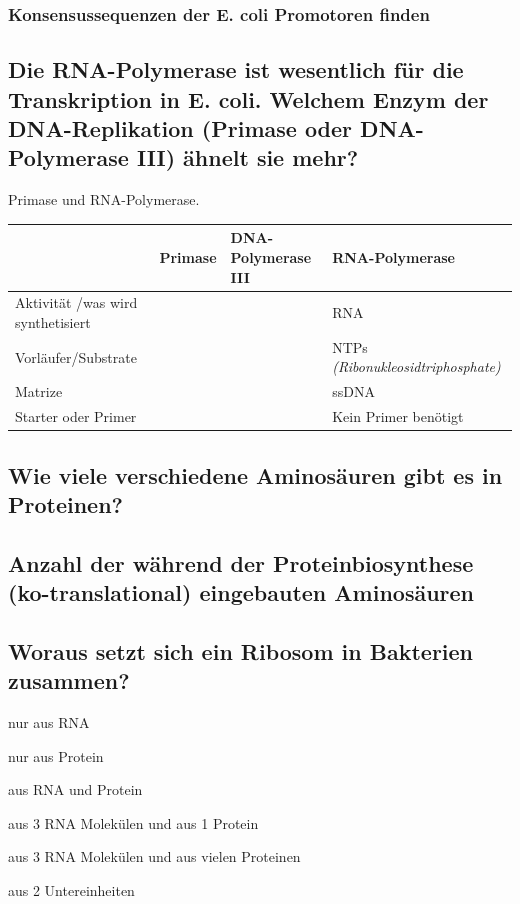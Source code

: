\documentclass{article}
\begin{document}
\subsubsection*{Konsensussequenzen der E. coli Promotoren finden}
\bigskip\bigskip\bigskip

\subsection*{Die RNA-Polymerase ist wesentlich für die Transkription in E. coli. Welchem Enzym der DNA-Replikation (Primase oder DNA-Polymerase III) ähnelt sie mehr?}
Primase und RNA-Polymerase. 
\begin{table}[h] 
    \centering
    \begin{tabular}{|p{3cm}||p{4cm}|p{4cm}|p{4cm}|}\hline
         & Primase &  DNA-Polymerase III & RNA-Polymerase\\ \hline \hline
         Aktivität /was wird synthetisiert & & &  RNA \\\hline
         Vorläufer/Substrate &  & & NTPs \textit{(Ribonukleosidtriphosphate)} \\\hline
         Matrize & & &  ssDNA \\\hline
         Starter oder Primer & & &  Kein Primer benötigt \\\hline
    \end{tabular}
    \label{tab:my_label}
\end{table}

\subsection*{Wie viele verschiedene Aminosäuren gibt es in
Proteinen?}
\bigskip\bigskip

\subsection*{Anzahl der während der Proteinbiosynthese (ko-translational) eingebauten Aminosäuren}
\bigskip\bigskip

\subsection*{Woraus setzt sich ein Ribosom in Bakterien zusammen?}
\begin{todolist}
\item nur aus RNA 
\item nur aus Protein
\item  aus RNA und Protein
\item  aus 3 RNA Molekülen und aus 1 Protein
\item aus 3 RNA Molekülen und aus vielen Proteinen 
\item  aus 2 Untereinheiten
\end{todolist} 
\end{document}
